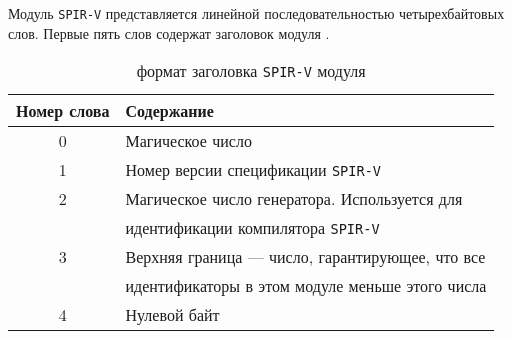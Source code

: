 \documentclass[14pt]{extarticle}
\begin{document}
Модуль \texttt{SPIR-V} представляется линейной последовательностью четырехбайтовых слов. Первые пять слов содержат заголовок модуля \cite{spv19}.

\begin{table}[h]
    \centering
    \caption{формат заголовка \texttt{SPIR-V} модуля}
    \begin{tabular}{| c | l |}
        \hline
        Номер слова & Содержание\\
        \hline
        0 & Магическое число\\
        \hline
        1 & Номер версии спецификации \texttt{SPIR-V}\\
        \hline
        2 & Магическое число генератора. Используется для\\ & идентификации компилятора \texttt{SPIR-V}\\
        \hline
        3 & Верхняя граница --- число, гарантирующее, что все \\ & идентификаторы в этом модуле меньше этого числа \\
        \hline
        4 & Нулевой байт\\
        \hline
    \end{tabular}
    \label{tab:spirv_header}
\end{table}
\end{document}
